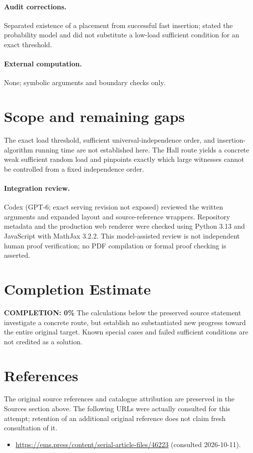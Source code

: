\documentclass[11pt]{article}
\begin{document}
\paragraph{Audit corrections.} Separated existence of a placement from successful fast insertion; stated the probability model and did not substitute a low-load sufficient condition for an exact threshold.
\paragraph{External computation.} None; symbolic arguments and boundary checks only.
\section{Scope and remaining gaps}
The exact load threshold, sufficient universal-independence order, and insertion-algorithm running time are not established here. The Hall route yields a concrete weak sufficient random load and pinpoints exactly which large witnesses cannot be controlled from a fixed independence order.
\paragraph{Integration review.} Codex (GPT-6; exact serving revision not exposed) reviewed the written arguments and expanded layout and source-reference wrappers. Repository metadata and the production web renderer were checked using Python 3.13 and JavaScript with MathJax 3.2.2. This model-assisted review is not independent human proof verification; no PDF compilation or formal proof checking is asserted.

\section{Completion Estimate}
\noindent\textbf{COMPLETION: 0\%}
The calculations below the preserved source statement investigate a concrete route,
but establish no substantiated new progress toward the entire original target.
Known special cases and failed sufficient conditions are not credited as a solution.
\section{References}
The original source references and catalogue attribution are preserved in the
Sources section above. The following URLs were actually consulted for this attempt;
retention of an additional original reference does not claim fresh consultation of it.
\begin{itemize}
\item \url{https://ems.press/content/serial-article-files/46223} (consulted 2026-10-11). 
\end{itemize}
\end{document}
